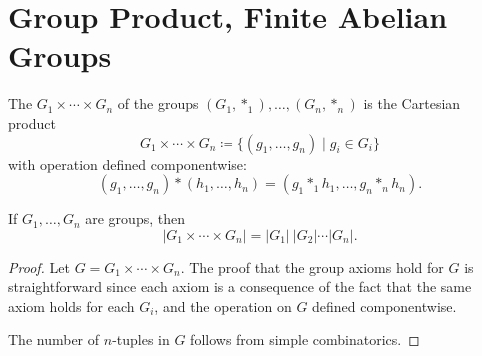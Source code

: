 \section{Group Product, Finite Abelian Groups}
\begin{definition}
The  $G_1\times\cdots\times G_n$ of the groups $(G_1,\ast_1),\dots,(G_n,\ast_n)$ is the Cartesian product
\[G_1\times\cdots\times G_n\coloneqq\{(g_1,\dots,g_n)\mid g_i\in G_i\}\]
with operation defined componentwise:
\[(g_1,\dots,g_n)\ast(h_1,\dots,h_n)=(g_1\ast_1 h_1,\dots,g_n\ast_n h_n).\]
\end{definition}

\begin{proposition}
If $G_1,\dots,G_n$ are groups, then
\[|G_1\times\cdots\times G_n|=|G_1|\:|G_2|\cdots|G_n|.\]
\end{proposition}

\begin{proof}
Let $G=G_1\times\cdots\times G_n$. The proof that the group axioms hold for $G$ is straightforward since each axiom is a consequence of the fact that the same axiom holds for each $G_i$, and the operation on $G$ defined componentwise.

The number of $n$-tuples in $G$ follows from simple combinatorics.
\end{proof}

